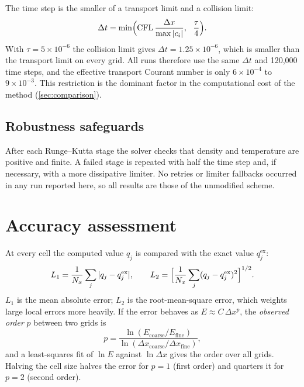 \documentclass[11pt]{article}
\begin{document}
The time step is the smaller of a transport limit and a collision limit:
\begin{equation}
\Delta t = \min\Bigl(\mathrm{CFL}\,\frac{\Delta x}{\max|c_i|},\ \ \frac{\tau}{4}\Bigr).
\label{eq:dt}
\end{equation}
With $\tau = 5\times10^{-6}$ the collision limit gives $\Delta t = 1.25\times10^{-6}$, which
is smaller than the transport limit on every grid.  All runs therefore use the same
$\Delta t$ and 120{,}000 time steps, and the effective transport Courant number is only
$6\times10^{-4}$ to $9\times10^{-3}$.  This restriction is the dominant factor in the
computational cost of the method (\cref{sec:comparison}).

\subsection{Robustness safeguards}
After each Runge--Kutta stage the solver checks that density and temperature are positive
and finite.  A failed stage is repeated with half the time step and, if necessary, with a
more dissipative limiter.  No retries or limiter fallbacks occurred in any run reported
here, so all results are those of the unmodified scheme.

\section{Accuracy assessment}
\label{sec:metrics}

At every cell the computed value $q_j$ is compared with the exact value $q_j^{\mathrm{ex}}$:
\begin{equation}
L_1 = \frac{1}{N_x}\sum_j |q_j - q_j^{\mathrm{ex}}|, \qquad
L_2 = \Bigl[\frac{1}{N_x}\sum_j (q_j - q_j^{\mathrm{ex}})^2\Bigr]^{1/2}.
\end{equation}
$L_1$ is the mean absolute error; $L_2$ is the root-mean-square error, which weights large
local errors more heavily.  If the error behaves as $E \approx C\,\Delta x^{p}$, the
\emph{observed order} $p$ between two grids is
\begin{equation}
p = \frac{\ln(E_{\text{coarse}}/E_{\text{fine}})}{\ln(\Delta x_{\text{coarse}}/\Delta x_{\text{fine}})},
\end{equation}
and a least-squares fit of $\ln E$ against $\ln\Delta x$ gives the order over all grids.
Halving the cell size halves the error for $p = 1$ (first order) and quarters it for $p = 2$
(second order).
\end{document}
